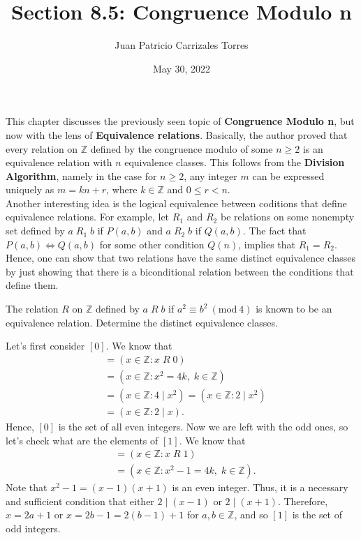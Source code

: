 \documentclass[12pt]{article}
\newcommand{\Z}{\mathbb{Z}}
\newcommand{\Mod}[1]{\ (\mathrm{mod}\ #1)}
\newenvironment{problem}[2][Problem]{\begin{trivlist} \item[\hskip \labelsep {\bfseries #1}\hskip \labelsep {\bfseries #2.}]}{\end{trivlist}}
\newenvironment{solution}[2][Solution]{\begin{trivlist} \item[\hskip \labelsep {\bfseries #1}\hskip \labelsep {\bfseries #2.}]}{\end{trivlist}}
\begin{document}
  
 \title{Section 8.5: Congruence Modulo n}
 \author{Juan Patricio Carrizales Torres}
\date{May 30, 2022}
\maketitle

This chapter discusses the previously seen topic of \textbf{Congruence Modulo n}, but now with the lens of
\textbf{Equivalence relations}. Basically, the author proved that every relation on $\Z$
defined by the congruence modulo of some $n\geq 2$ is an equivalence relation with $n$ equivalence
classes. This follows from the \textbf{Division Algorithm}, namely in the case for $n\geq 2$, any integer $m$ can be expressed uniquely 
as $m=kn+r$, where $k\in \Z$ and $0\leq r < n$.\\

Another interesting idea is the logical equivalence between coditions that define equivalence relations.
For example, let $R_{1}$ and $R_{2}$ be relations on some nonempty set defined by $a\; R_{1} \;b$ if $P(a,b)$ and $a\; R_{2} \;b$ if $Q(a,b)$. The fact that 
$P(a,b) \iff Q(a,b)$ for some other condition $Q(n)$, implies that $R_{1} = R_{2}$. 
Hence, one can show that two relations have the same distinct equivalence classes by just showing that there is a 
biconditional relation between the conditions that define them.

\begin{problem}{47}
  The relation $R$ on $\Z$ defined by $a \; R \; b$ if $a^{2} \equiv b^{2} \Mod{4}$ is known to be
  an equivalence relation. Determine the distinct equivalence classes.
  \begin{solution}{47}
    Let's first consider $[0]$. We know that
    \begin{align*}
      [0] &= \left(x\in\Z:x\; R\;0 \right)\\
      &= \left(x\in\Z: x^{2} = 4k,\; k\in \Z\right)\\
      &= \left(x\in\Z: 4\mid x^{2}\right) = \left(x\in\Z: 2\mid x^{2}\right)\\
      &= \left(x\in\Z:2\mid x\right). 
    \end{align*}
    Hence, $[0]$ is the set of all even integers. Now we are left with the odd ones, so let's check what are the elements of $[1]$. We know that
    \begin{align*}
       [1] &= \left(x\in\Z:x\; R\;1 \right)\\
      &= \left(x\in\Z: x^{2}-1 = 4k,\; k\in \Z\right).
    \end{align*}
    Note that $x^{2}-1 = (x-1)(x+1)$ is an even integer. Thus, it is a necessary and sufficient condition that either $2\mid(x-1)$ or $2\mid(x+1)$. Therefore, $x=2a+1$ or $x=2b-1=2(b-1)+1$ for $a,b\in\Z$, and so $[1]$ is the set of odd integers.
  \end{solution}
\end{problem}
\end{document}
